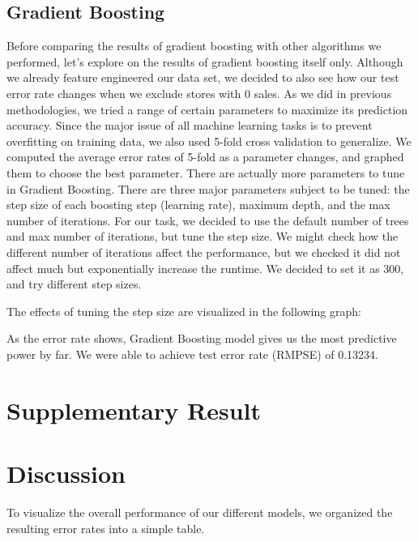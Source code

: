 \documentclass[letterpaper,twocolumn,11pt]{article}
\begin{document}
\subsection{Gradient Boosting}
Before comparing the results of gradient boosting with other algorithms we performed, let's explore on the results of gradient boosting itself only. Although we already feature engineered our data set, we decided to also see how our test error rate changes when we exclude stores with 0 sales. As we did in previous methodologies, we tried a range of certain parameters to maximize its prediction accuracy. Since the major issue of all machine learning tasks is to prevent overfitting on training data, we also used 5-fold cross validation to generalize. We computed the average error rates of 5-fold as a parameter changes, and graphed them to choose the best parameter. There are actually more parameters to tune in Gradient Boosting. There are three major parameters subject to be tuned: the step size of each boosting step (learning rate), maximum depth, and the max number of iterations. For our task, we decided to use the default number of trees and max number of iterations, but tune the step size. We might check how the different number of iterations affect the performance, but we checked it did not affect much but exponentially increase the runtime. We decided to set it as 300, and try different step sizes. 

The effects of tuning the step size are visualized in the following graph:


As the error rate shows, Gradient Boosting model gives us the most predictive power by far. We were able to achieve test error rate (RMPSE) of 0.13234.


\section{Supplementary Result}

\section{Discussion}
To visualize the overall performance of our different models, we organized the resulting error rates into a simple table. 
\end{document}
